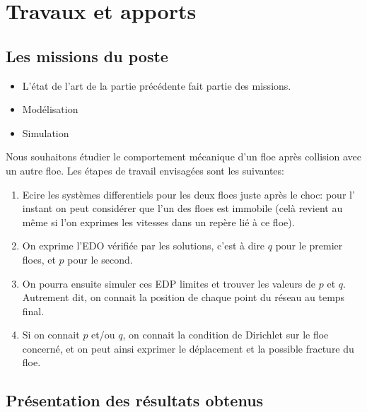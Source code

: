
\chapter{Travaux et apports} %

\label{Chapter4} %




\section{Les missions du poste}

\begin{itemize}
    \item L'état de l'art de la partie précédente fait partie des missions.
    \item Modélisation
    \item Simulation
\end{itemize}

Nous souhaitons étudier le comportement mécanique d'un floe après collision avec un autre floe. Les étapes de travail envisagées sont les suivantes:
\begin{enumerate}
    \item Ecire les systèmes differentiels pour les deux floes juste après le choc: pour l' instant on peut considérer que l'un des floes est immobile (celà revient au même si l'on exprimes les vitesses dans un repère lié à ce floe).
    \item On exprime l'EDO vérifiée par les solutions, c'est à dire $q$ pour le premier floes, et $p$ pour le second.
    \item On pourra ensuite simuler ces EDP limites et trouver les valeurs de $p$ et $q$. Autrement dit, on connait la position de chaque point du réseau au temps final.
    \item Si on connait $p$ et/ou $q$, on connait la condition de Dirichlet sur le floe concerné, et on peut ainsi exprimer le déplacement et la possible fracture du floe. 
\end{enumerate}




\section{Présentation des résultats obtenus}



